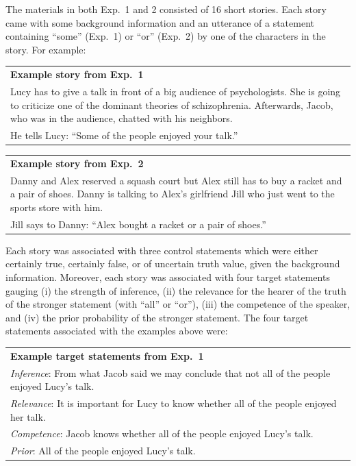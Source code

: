\documentclass[12pt]{article}
\begin{document}
The materials in both Exp.\ 1 and 2 consisted of 16 short stories. Each story
came with some background information and an utterance of a statement containing ``some'' (Exp.\
1) or ``or'' (Exp.\ 2) by one of the characters in the story. For example:

\begin{center}
\begin{tabular}{p{10cm}}
\textbf{Example story from Exp.\ 1} \\
  Lucy has to give a talk in front of a big audience of psychologists. She is going to criticize one of the dominant theories of schizophrenia. Afterwards, Jacob, who was in the audience, chatted with his neighbors.\\[.2cm]
  He tells Lucy: ``Some of the people enjoyed your talk.''
\end{tabular}
\end{center}


\begin{center}
\begin{tabular}{p{10cm}}
\textbf{Example story from Exp.\ 2} \\
  Danny and Alex reserved a squash court but Alex still has to buy a racket and a pair of
  shoes. Danny is talking to Alex's girlfriend Jill who just went to the sports store with
  him.\\[.2cm]
  Jill says to Danny: ``Alex bought a racket or a pair of shoes.''
\end{tabular}
\end{center}

\noindent Each story was associated with three control statements which were either certainly
true, certainly false, or of uncertain truth value, given the background information. Moreover,
each story was associated with four target statements gauging (i) the strength of inference,
(ii) the relevance for the hearer of the truth of the stronger statement (with ``all'' or
``or''), (iii) the competence of the speaker, and (iv) the prior probability of the stronger
statement. The four target statements associated with the examples above were:

\begin{center}
\begin{tabular}{p{10cm}}
\textbf{Example target statements from Exp.\ 1} \\[.2cm]
\emph{Inference}: From what Jacob said we may conclude that not all of the people enjoyed Lucy's talk.\\[.1cm]
\emph{Relevance}: It is important for Lucy to know whether all of the people enjoyed her talk.\\[.1cm]
  \emph{Competence}: Jacob knows whether all of the people enjoyed Lucy's talk. \\[.1cm]
  \emph{Prior}: All of the people enjoyed Lucy's talk.
\end{tabular}
\end{center}
\end{document}
